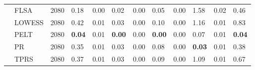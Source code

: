 \begin{table}[ht]
\begin{tabular}{llrlrlrlrlrl}
   & FLSA & 2080 & 0.18 & 0.00 & 0.02 & 0.00 & 0.05 & 0.00 & 1.58 & 0.02 & 0.46 \\ 
   & LOWESS & 2080 & 0.42 & 0.01 & 0.03 & 0.00 & 0.10 & 0.00 & 1.16 & 0.01 & 0.83 \\ 
   & PELT & 2080 & \textbf{0.04} & 0.01 & \textbf{0.00} & 0.00 & \textbf{0.00} & 0.00 & 0.07 & 0.01 & \textbf{0.04} \\ 
   & PR & 2080 & 0.35 & 0.01 & 0.03 & 0.00 & 0.08 & 0.00 & \textbf{0.03} & 0.01 & 0.38 \\ 
   & TPRS & 2080 & 0.37 & 0.01 & 0.03 & 0.00 & 0.09 & 0.00 & 1.09 & 0.01 & 0.67 \\ 
   \bottomrule
\end{tabular}
\end{table}
